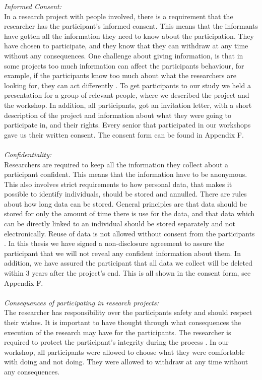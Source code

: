 \emph{Informed Consent:} \\
In a research project with people involved, there is a requirement that the researcher has the participant's informed consent. This means that the informants have gotten all the information they need to know about the participation. They have chosen to participate, and they know that they can withdraw at any time without any consequences. One challenge about giving information, is that in some projects too much information can affect the participants behaviour, for example, if the participants know too much about what the researchers are looking for, they can act differently \cite{qualitative}. To get participants to our study we held a presentation for a group of relevant people, where we described the project and the workshop. In addition, all participants, got an invitation letter, with a short description of the project and information about what they were going to participate in, and their rights. Every senior that participated in our workshops gave us their written consent. The consent form can be found in Appendix F.   \\ \\
\emph{Confidentiality:}\\
Researchers are required to keep all the information they collect about a participant confident. This means that the information have to be anonymous. This also involves strict requirements to how personal data, that makes it possible to identify individuals, should be stored and annulled. There are rules about how long data can be stored. General principles are that data should be stored for only the amount of time there is use for the data, and that data which can be directly linked to an individual should be stored separately and not electronically.  Reuse of data is not allowed without consent from the participants \cite{qualitative}. In this thesis we have signed a non-disclosure agreement to assure the participant that we will not reveal any confident information about them. In addition, we have assured the participant that all data we collect will be deleted within 3 years after the project's end. This is all shown in the consent form, see Appendix F. \\ \\
\emph{Consequences of participating in research projects:}\\
The researcher has responsibility over the participants safety and should respect their wishes. It is important to have thought through what consequences the execution of the research may have for the participants. The researcher is required to protect the participant's integrity during the process \cite{qualitative}. In our workshop, all participants were allowed to choose what they were comfortable with doing and not doing. They were allowed to withdraw at any time without any consequences.  \\ \\

